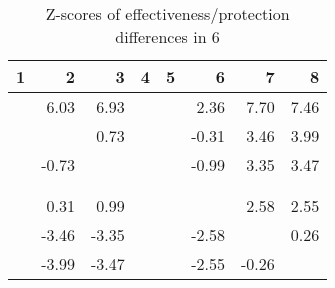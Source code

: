 \begin{table}[ht]
\centering
\begin{tabular}{rrrrrrrr}
  \hline
1 & 2 & 3 & 4 & 5 & 6 & 7 & 8 \\ 
  \hline
 & 6.03 & 6.93 &  &  & 2.36 & 7.70 & 7.46 \\ 
   &  & 0.73 &  &  & -0.31 & 3.46 & 3.99 \\ 
   & -0.73 &  &  &  & -0.99 & 3.35 & 3.47 \\ 
   &  &  &  &  &  &  &  \\ 
   &  &  &  &  &  &  &  \\ 
   & 0.31 & 0.99 &  &  &  & 2.58 & 2.55 \\ 
   & -3.46 & -3.35 &  &  & -2.58 &  & 0.26 \\ 
   & -3.99 & -3.47 &  &  & -2.55 & -0.26 &  \\ 
   \hline
\end{tabular}
\caption{Z-scores of effectiveness/protection differences in  6} 
\end{table}
